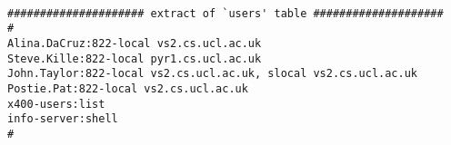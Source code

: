 \small\begin{verbatim}

##################### extract of `users' table ####################
#
Alina.DaCruz:822-local vs2.cs.ucl.ac.uk
Steve.Kille:822-local pyr1.cs.ucl.ac.uk
John.Taylor:822-local vs2.cs.ucl.ac.uk, slocal vs2.cs.ucl.ac.uk
Postie.Pat:822-local vs2.cs.ucl.ac.uk
x400-users:list
info-server:shell
#
\end{verbatim}
